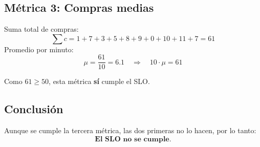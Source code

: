 \subsection{Métrica 3: Compras medias}\label{subsec:metrica-3:-compras-medias}
Suma total de compras:
\[
    \sum c = 1 + 7 + 3 + 5 + 8 + 9 + 0 + 10 + 11 + 7 = 61
\]
Promedio por minuto:
\[
    \mu = \frac{61}{10} = 6.1\quad\Rightarrow\quad 10 \cdot \mu = 61
\]
\begin{solucion}[parte 3]

    Como $61 \geq 50$, esta métrica \textbf{sí} cumple el SLO\@.
\end{solucion}
\begin{solucion}
    \subsection*{Conclusión}
    Aunque se cumple la tercera métrica, las dos primeras no lo hacen, por lo tanto:
    \[
        \textbf{El SLO no se cumple.}
    \]
\end{solucion}